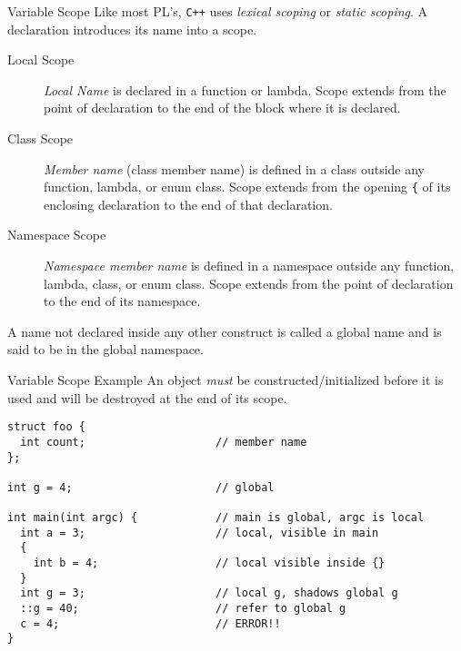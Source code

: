 \documentclass[presentation]{beamer}
\begin{document}
\begin{frame}[fragile,label={sec:orgheadline22}]{Variable Scope}
 Like most PL's, \texttt{C++} uses \emph{lexical scoping} or \emph{static scoping}.
A declaration introduces its name into a scope.

\begin{description}
\item[{Local Scope}] \emph{Local Name} is declared in a function or lambda.
Scope extends from the point of declaration to the end of the
block where it is declared.
\item[{Class Scope}] \emph{Member name} (class member name) is defined in a
class outside any function, lambda, or enum class.  Scope
extends from the opening \texttt{\{} of its enclosing declaration to
the end of that declaration.
\item[{Namespace Scope}] \emph{Namespace member name} is defined in a
namespace outside any function, lambda, class, or enum class.
Scope extends from the point of declaration to the end of its
namespace.
\end{description}


A name not declared inside any other construct is called a global
name and is said to be in the global namespace.
\end{frame}

\begin{frame}[fragile,label={sec:orgheadline23}]{Variable Scope Example}
 An object \emph{must} be constructed/initialized before it is used and
will be destroyed at the end of its scope.

\begin{verbatim}
struct foo {
  int count;                    // member name
};

int g = 4;                      // global

int main(int argc) {            // main is global, argc is local
  int a = 3;                    // local, visible in main
  {
    int b = 4;                  // local visible inside {}
  }
  int g = 3;                    // local g, shadows global g
  ::g = 40;                     // refer to global g
  c = 4;                        // ERROR!!
}
\end{verbatim}
\end{frame}
\end{document}
